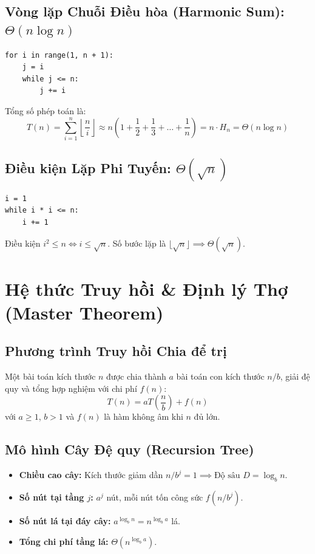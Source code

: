 \documentclass[11pt,a4paper]{article}
\begin{document}
\subsection{Vòng lặp Chuỗi Điều hòa (Harmonic Sum): $\Theta(n \log n)$}
\begin{lstlisting}[style=pythonstyle]
for i in range(1, n + 1):
    j = i
    while j <= n:
        j += i
\end{lstlisting}
Tổng số phép toán là:
\[
T(n) = \sum_{i=1}^n \left\lfloor \frac{n}{i} \right\rfloor \approx n \left(1 + \frac{1}{2} + \frac{1}{3} + \dots + \frac{1}{n}\right) = n \cdot H_n = \Theta(n \log n)
\]

\subsection{Điều kiện Lặp Phi Tuyến: $\Theta(\sqrt{n})$}
\begin{lstlisting}[style=pythonstyle]
i = 1
while i * i <= n:
    i += 1
\end{lstlisting}
Điều kiện $i^2 \le n \iff i \le \sqrt{n}$. Số bước lặp là $\lfloor \sqrt{n} \rfloor \implies \Theta(\sqrt{n})$.

\newpage
\section{Hệ thức Truy hồi \& Định lý Thợ (Master Theorem)}

\subsection{Phương trình Truy hồi Chia để trị}
Một bài toán kích thước $n$ được chia thành $a$ bài toán con kích thước $n/b$, giải đệ quy và tổng hợp nghiệm với chi phí $f(n)$:
\[
T(n) = a T\left(\frac{n}{b}\right) + f(n)
\]
với $a \ge 1$, $b > 1$ và $f(n)$ là hàm không âm khi $n$ đủ lớn.

\subsection{Mô hình Cây Đệ quy (Recursion Tree)}
\begin{itemize}[itemsep=2pt]
    \item \textbf{Chiều cao cây:} Kích thước giảm dần $n/b^j = 1 \implies \text{Độ sâu } D = \log_b n$.
    \item \textbf{Số nút tại tầng $j$:} $a^j$ nút, mỗi nút tốn công sức $f(n/b^j)$.
    \item \textbf{Số nút lá tại đáy cây:} $a^{\log_b n} = n^{\log_b a}$ lá.
    \item \textbf{Tổng chi phí tầng lá:} $\Theta(n^{\log_b a})$.
\end{itemize}
\end{document}
